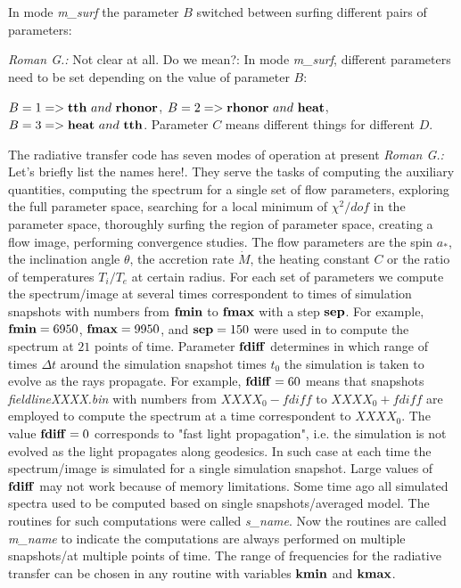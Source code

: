 \documentclass{emulateapj}
\newcommand{\rg}[1]{\color{blue}\textit{Roman G.:} #1\color{black}}
\begin{document}
In mode \textit{m\_surf} the parameter $B$ switched between surfing
different pairs of parameters: 

\rg{Not clear at all. Do we mean?: In mode \textit{m\_surf}, different
  parameters need to be set depending on the value of parameter $B$: }

$B=1 => {\bf tth}~and~{\bf rhonor}$, $B=2 => {\bf rhonor}~and~{\bf
  heat}$, $B=3 => {\bf heat}~and~{\bf tth}$.  Parameter $C$ means
different things for different $D$.

The radiative transfer code has seven modes of operation at present
\rg{Let's briefly list the names here!}. They serve the tasks of
computing the auxiliary quantities, computing the spectrum for a
single set of flow parameters, exploring the full parameter space,
searching for a local minimum of $\chi^2/dof$ in the parameter space,
thoroughly surfing the region of parameter space, creating a flow
image, performing convergence studies.  The flow parameters are the
spin $a_*$, the inclination angle $\theta$, the accretion rate
$\dot{M}$, the heating constant $C$ or the ratio of temperatures
$T_i/T_e$ at certain radius.  For each set of parameters we compute
the spectrum/image at several times correspondent to times of
simulation snapshots with numbers from ${\bf fmin}$ to ${\bf fmax}$
with a step ${\bf sep}$. For example, ${\bf fmin}=6950$, ${\bf
  fmax}=9950$, and ${\bf sep}=150$ were used in
\citet{Shcherbakov:2012appl} to compute the spectrum at $21$ points of
time. Parameter ${\bf fdiff}$ determines in which range of times
$\Delta t$ around the simulation snapshot times $t_0$ the simulation
is taken to evolve as the rays propagate. For example, ${\bf
  fdiff}=60$ means that snapshots \textit{fieldlineXXXX.bin} with
numbers from $XXXX_0-fdiff$ to $XXXX_0+fdiff$ are employed to compute
the spectrum at a time correspondent to $XXXX_0$. The value ${\bf
  fdiff}=0$ corresponds to "fast light propagation", i.e. the
simulation is not evolved as the light propagates along geodesics. In
such case at each time the spectrum/image is simulated for a single
simulation snapshot. Large values of ${\bf fdiff}$ may not work
because of memory limitations. Some time ago all simulated spectra
used to be computed based on single snapshots/averaged model.  The
routines for such computations were called \textit{s\_name}. Now the
routines are called \textit{m\_name} to indicate the computations are
always performed on multiple snapshots/at multiple points of time.
The range of frequencies for the radiative transfer can be chosen in
any routine with variables ${\bf kmin}$ and ${\bf kmax}$.
\end{document}
